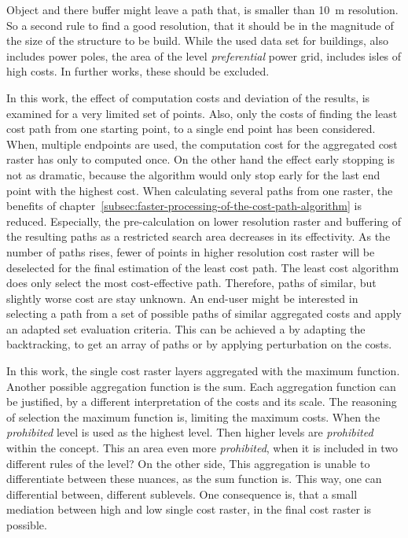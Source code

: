 Object and there buffer might leave a  path that, is smaller than 10~m resolution.
So a second rule to find a good resolution, that it should be in the magnitude of the size of the structure  to be build.
While the used data set for buildings, also includes power poles, the area of the level \textit{preferential} power grid, includes isles of high costs. 
In further works, these should be excluded.

In this work, the effect of computation costs and deviation of the results, is examined for a very limited set of points.
Also, only the costs of finding the least cost path from one starting point, to a single end point has been considered.
When, multiple endpoints are used, the computation cost for the aggregated cost raster has only to computed once.
On the other hand the effect early stopping is not as dramatic, because the algorithm would only stop early for the last end point with the highest cost.
When calculating several paths from one raster, the benefits of chapter~\ref{subsec:faster-processing-of-the-cost-path-algorithm} is reduced.
Especially, the pre-calculation on lower resolution raster and buffering of the resulting paths as a restricted search area decreases in its effectivity.
As the number of paths rises, fewer of points in higher resolution cost raster will be deselected for the final estimation of the least cost path.
The least cost algorithm does only select the most cost-effective path.
Therefore, paths of similar, but slightly worse cost are stay unknown.
An end-user might be interested in selecting a path from a set of possible paths of similar aggregated costs and apply an adapted set evaluation criteria.
This can be achieved a by adapting the backtracking, to get an array of paths or by applying perturbation on the costs.

In this work, the single cost raster layers aggregated with the maximum function. 
Another possible aggregation function is the sum.
Each aggregation function can be justified, by a different interpretation of the costs and its scale.
The reasoning of selection the maximum function is, limiting the maximum costs.
When the \textit{prohibited} level is used as the highest level.
Then higher levels are \textit{prohibited} within the concept.
This an area even more \textit{prohibited}, when it is included in two different rules of the level?
On the other side, This aggregation is unable to differentiate between these nuances, as  the sum function is.
This way, one can differential between, different sublevels.
One consequence is, that a small mediation between high and low single cost raster, in the final cost raster is possible.

